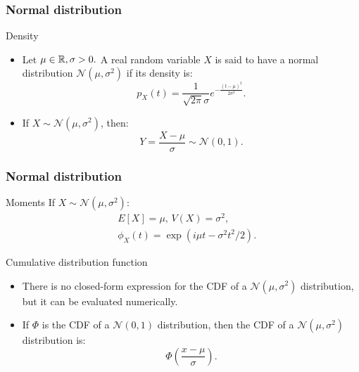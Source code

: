 \begin{frame}
    \frametitle{Normal distribution}
\begin{block}{Density}
    \begin{itemize}
        \item<+-> Let $\mu \in \mathbb{R}, \sigma > 0.$ A real random variable $X$
        is said to have a normal distribution $\mathcal{N}(\mu,\sigma^2)$ if its
        density is:
        \begin{equation}
            p_X(t)=\frac{1}{\sqrt{2 \pi}\sigma}e^{-\frac{(t-\mu)^2}{2 \sigma^2}}.
        \end{equation}
        \item<+-> If $X \sim \mathcal{N}(\mu,\sigma^2)$, then:
        \begin{equation}
            Y = \frac{X-\mu}{\sigma} \sim \mathcal{N}(0,1).
        \end{equation}
    \end{itemize}
\end{block}
\end{frame}
\begin{frame}
    \frametitle{Normal distribution}
\begin{block}{Moments}
    If $X\sim \mathcal{N}\left(\mu, \sigma^2\right):$
    \begin{equation}
        \begin{split}
            &E\left[ X \right] = \mu, \, V\left( X \right) = \sigma^2,\\
            & \phi_X(t)= \exp\left( i \mu t - \sigma^2 t^2 / 2 \right).
        \end{split}
    \end{equation}
\end{block}
\begin{block}{Cumulative distribution function}
    \begin{itemize}
        \item<+-> There is no closed-form expression for the CDF of 
        a $\mathcal{N}(\mu, \sigma^2)$ distribution, but it can be evaluated
        numerically.
        \item<+-> If $\Phi$ is the CDF of a $\mathcal{N}(0,1)$ distribution,
        then the CDF of a $\mathcal{N}(\mu,\sigma^2)$ distribution is:
        \begin{equation}
            \Phi \left( \frac{x-\mu}{\sigma} \right).
        \end{equation}
    \end{itemize}
\end{block}    
\end{frame}
